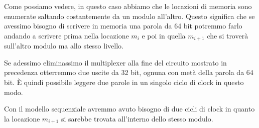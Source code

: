 Come possiamo vedere, in questo caso abbiamo che le locazioni di memoria sono enumerate saltando
costantemente da un modulo all'altro. Questo significa che se avessimo bisogno di scrivere in
memoria una parola da 64 bit potremmo farlo andando a scrivere prima nella locazione $m_i$ e poi in
quella $m_{i+1}$ che si troverà sull'altro modulo ma allo stesso livello.

Se adessimo eliminassimo il multiplexer alla fine del circuito mostrato in precedenza otterremmo
due uscite da 32 bit, ognuna con metà della parola da 64 bit. \`E quindi possibile leggere due
parole in un singolo ciclo di clock in questo modo.

Con il modello sequenziale avremmo avuto bisogno di due cicli di clock in quanto la locazione
$m_{i+1}$ si sarebbe trovata all'interno dello stesso modulo.

